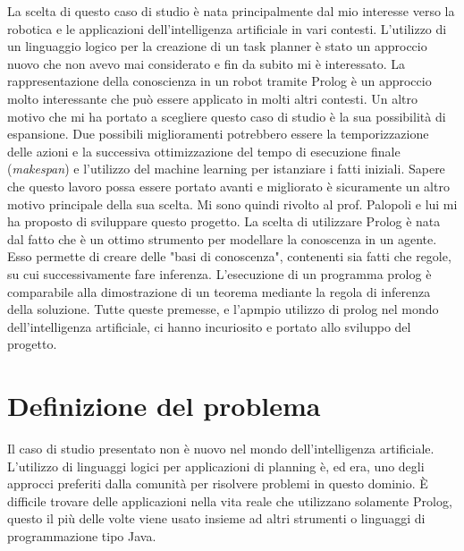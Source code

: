 La scelta di questo caso di studio è nata principalmente dal mio interesse verso la robotica e le applicazioni dell'intelligenza artificiale in vari contesti.
L'utilizzo di un linguaggio logico per la creazione di un task planner è stato un approccio nuovo che non avevo mai considerato e fin da subito mi è interessato. 
La rappresentazione della conoscienza in un robot tramite Prolog è un approccio molto interessante che può essere applicato in molti altri contesti.
Un altro motivo che mi ha portato a scegliere questo caso di studio è la sua possibilità di espansione. Due possibili miglioramenti potrebbero essere
la temporizzazione delle azioni e la successiva ottimizzazione del tempo
di esecuzione finale (\textit{makespan}) e l'utilizzo del machine learning per istanziare i fatti iniziali.
Sapere che questo lavoro possa essere portato avanti e migliorato è sicuramente un altro motivo principale della sua scelta.
Mi sono quindi rivolto al prof. Palopoli e lui mi ha proposto di sviluppare questo progetto.
La scelta di utilizzare Prolog è nata dal fatto che è un ottimo strumento per modellare la conoscenza in un agente.
Esso permette di creare delle "basi di conoscenza", contenenti sia fatti che regole, su cui successivamente fare inferenza.
L'esecuzione di un programma prolog è comparabile alla dimostrazione di un teorema mediante la regola di inferenza della soluzione.
Tutte queste premesse, e l'apmpio utilizzo di prolog nel mondo dell'intelligenza artificiale, ci hanno incuriosito e portato allo sviluppo del progetto.

\section{Definizione del problema}
\label{sec:defprob}
Il caso di studio presentato non è nuovo nel mondo dell'intelligenza artificiale. L'utilizzo di linguaggi logici per applicazioni di planning è, ed era, uno
degli approcci preferiti dalla comunità per risolvere problemi in questo dominio. È difficile trovare delle applicazioni nella vita reale che utilizzano solamente Prolog, questo il 
più delle volte viene usato insieme ad altri strumenti o linguaggi di programmazione tipo Java. 

